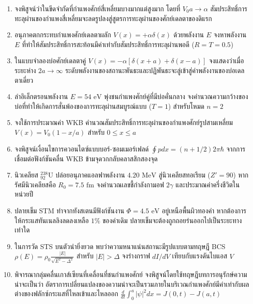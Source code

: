 \begin{enumerate}
    \item จงพิสูจน์ว่าในขีดจำกัดที่กำแพงศักย์สี่เหลี่ยมบางมากแต่สูงมาก โดยที่ $V_0 a \to \alpha$ สัมประสิทธิ์การทะลุผ่านของกำแพงสี่เหลี่ยมจะลดรูปลงสู่สูตรการทะลุผ่านของศักย์เดลตาของดิแรก
    
    \item อนุภาคตกกระทบกำแพงศักย์เดลตาผลัก $V(x) = +\alpha\delta(x)$ ด้วยพลังงาน $E$ จงหาพลังงาน $E$ ที่ทำให้สัมประสิทธิ์การสะท้อนมีค่าเท่ากับสัมประสิทธิ์การทะลุผ่านพอดี ($R = T = 0.5$)
    
    \item ในแบบจำลองบ่อศักย์เดลตาคู่ $V(x) = -\alpha[\delta(x+a) + \delta(x-a)]$ จงแสดงว่าเมื่อระยะห่าง $2a \to \infty$ ระดับพลังงานของสถานะพันธะและปฏิพันธะจะลู่เข้าสู่ค่าพลังงานของบ่อเดลตาเดี่ยว
    
    \item ลำอิเล็กตรอนพลังงาน $E = 54\text{ eV}$ พุ่งชนกำแพงศักย์คู่ที่มีบ่อคั่นกลาง จงคำนวณความกว้างของบ่อที่ทำให้เกิดการสั่นพ้องของการทะลุผ่านสมบูรณ์แบบ ($T=1$) สำหรับโหมด $n=2$
    
    \item จงใช้การประมาณค่า WKB คำนวณสัมประสิทธิ์การทะลุผ่านของกำแพงศักย์รูปสามเหลี่ยม $V(x) = V_0 (1 - x/a)$ สำหรับ $0 \le x \le a$
    
    \item จงพิสูจน์เงื่อนไขการควอนไตซ์แบบบอร์-ซอมเมอร์เฟลด์ $\oint p dx = (n + 1/2)2\pi\hbar$ จากการเชื่อมต่อฟังก์ชันคลื่น WKB ข้ามจุดวกกลับคลาสสิกสองจุด
    
    \item นิวเคลียส $^{238}_{92}\text{U}$ ปล่อยอนุภาคแอลฟาพลังงาน $4.20\text{ MeV}$ สู่นิวเคลียสทอเรียม ($Z'=90$) หากรัศมีนิวเคลียสคือ $R_0 = 7.5\text{ fm}$ จงคำนวณเลขชี้กำลังกามอฟ $2\gamma$ และประมาณค่าครึ่งชีวิตในหน่วยปี
    
    \item ปลายเข็ม STM ทำจากทังสเตนมีฟังก์ชันงาน $\Phi = 4.5\text{ eV}$ อยู่เหนือพื้นผิวทองคำ หากต้องการให้กระแสทันเนลลิงลดลงเหลือ $1\%$ ของค่าเดิม ปลายเข็มจะต้องถูกถอยร่นออกไปเป็นระยะทางเท่าใด
    
    \item ในการวัด STS บนตัวนำยิ่งยวด พบว่าความหนาแน่นสถานะมีรูปแบบตามทฤษฎี BCS $\rho(E) = \rho_0 \frac{|E|}{\sqrt{E^2 - \Delta^2}}$ สำหรับ $|E| > \Delta$ จงร่างกราฟ $dI/dV$ เทียบกับแรงดันไบแอส $V$
    
    \item พิจารณากลุ่มคลื่นเกาส์เซียนที่เคลื่อนที่ชนกำแพงศักย์ จงพิสูจน์โดยใช้ทฤษฎีบทการอนุรักษ์ความน่าจะเป็นว่า อัตราการเปลี่ยนแปลงของความน่าจะเป็นรวมภายในบริเวณกำแพงศักย์มีค่าเท่ากับผลต่างของฟลักซ์กระแสที่ไหลเข้าและไหลออก $\frac{d}{dt}\int_0^a |\psi|^2 dx = J(0, t) - J(a, t)$
\end{enumerate}
